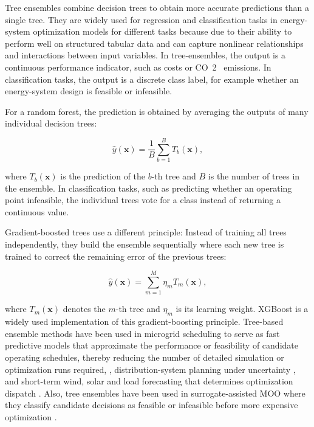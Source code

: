 \documentclass[final,5p,times,twocolumn]{elsarticle}
\begin{document}
Tree ensembles combine decision trees to obtain more accurate
predictions than a single tree. They are widely used for regression and
classification tasks in energy-system optimization models for different
tasks because due to their ability to perform well on structured tabular
data and can capture nonlinear relationships and interactions between
input variables. In tree-ensembles, the output is a continuous
performance indicator, such as costs or CO~2~ emissions. In
classification tasks, the output is a discrete class label, for example
whether an energy-system design is feasible or infeasible.

For a random forest, the prediction is obtained by averaging the outputs
of many individual decision trees:

$$\begin{equation}
 \hat{y}(\mathbf{x}) = \frac{1}{B} \sum_{b=1}^{B} T_b(\mathbf{x}),
\end{equation}$$

where $T_b(\mathbf{x})$ is the prediction of the $b$-th tree and $B$ is
the number of trees in the ensemble. In classification tasks, such as
predicting whether an operating point infeasible, the individual trees
vote for a class instead of returning a continuous value.

Gradient-boosted trees use a different principle: Instead of training
all trees independently, they build the ensemble sequentially where each
new tree is trained to correct the remaining error of the previous
trees:

$$\begin{equation}
 \hat{y}(\mathbf{x}) = \sum_{m=1}^{M} \eta_m T_m(\mathbf{x}),
\end{equation}$$

where $T_m(\mathbf{x})$ denotes the $m$-th tree and $\eta_m$ is its
learning weight. XGBoost is a widely used implementation of this
gradient-boosting principle. Tree-based ensemble methods have been used
in microgrid scheduling to serve as fast predictive models that
approximate the performance or feasibility of candidate operating
schedules, thereby reducing the number of detailed simulation or
optimization runs required,
\cite{Eseye201991463,Faraji2020157284,Wang20192635,Nematollahi2021},
distribution-system planning under uncertainty
\cite{Fu20202904,Fu2022,Jahangiri20244849,Jahangiri2023}, and
short-term wind, solar and load forecasting that determines optimization
dispatch \cite{Li2020,Hanifi2024,Alkesaiberi2022,Madhukumar20228891}.
Also, tree ensembles have been used in surrogate-assisted MOO where they
classify candidate decisions as feasible or infeasible before more
expensive optimization
\cite{Han2018622,Schulte2020,Pang2023,Xiao2018}.
\end{document}
